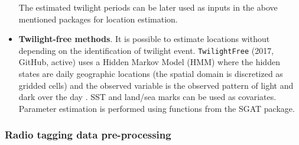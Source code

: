 \documentclass[a4paper,12pt]{article}
\newcommand{\Rpkg}[1]{\texttt{#1}}
\begin{document}
\begin{itemize}
The estimated twilight periods can be later used as inputs in the above mentioned packages for location estimation.
        \item \textbf{Twilight-free methods}. It is possible to estimate locations without depending on the identification of twilight event. %
        \Rpkg{TwilightFree} (2017, GitHub, active) uses a Hidden Markov Model (HMM) where the hidden states are daily geographic locations (the spatial domain is discretized as gridded cells) and the observed variable is the observed pattern of light and dark over the day \citep{Bindoff2017}. SST and land/sea marks can be used as covariates. Parameter estimation is performed using functions from the SGAT package. %
\end{itemize}


\subsubsection*{Radio tagging data pre-processing}
\end{document}
